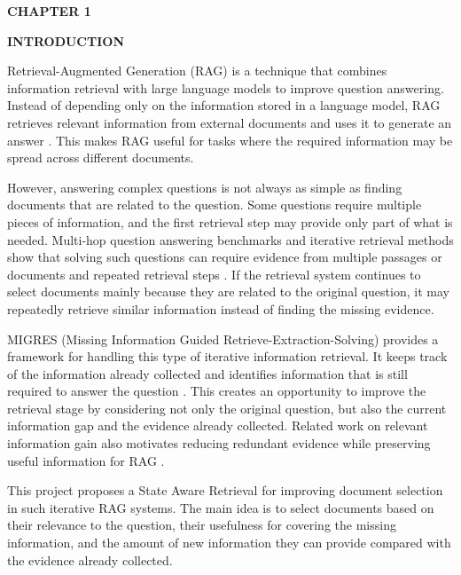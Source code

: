 \documentclass[12pt,a4paper]{report}
\newcommand{\chaptertitle}[2]{
    \begin{center}
        {\fontsize{18}{21}\selectfont\bfseries CHAPTER #1\par}
        \vspace{0.10in}
        {\fontsize{18}{21}\selectfont\bfseries #2\par}
    \end{center}
    \vspace{0.12in}
}
\begin{document}



\setcounter{page}{1}
\chaptertitle{1}{INTRODUCTION}
\justifying

Retrieval-Augmented Generation (RAG) is a technique that combines information retrieval with large language models to improve question answering. Instead of depending only on the information stored in a language model, RAG retrieves relevant information from external documents and uses it to generate an answer \cite{lewis2020rag}. This makes RAG useful for tasks where the required information may be spread across different documents.

However, answering complex questions is not always as simple as finding documents that are related to the question. Some questions require multiple pieces of information, and the first retrieval step may provide only part of what is needed. Multi-hop question answering benchmarks and iterative retrieval methods show that solving such questions can require evidence from multiple passages or documents and repeated retrieval steps \cite{yang2018hotpotqa,trivedi2022musique,yadav2020iterative}. If the retrieval system continues to select documents mainly because they are related to the original question, it may repeatedly retrieve similar information instead of finding the missing evidence.

MIGRES (Missing Information Guided Retrieve-Extraction-Solving) provides a framework for handling this type of iterative information retrieval. It keeps track of the information already collected and identifies information that is still required to answer the question \cite{wang2025migres}. This creates an opportunity to improve the retrieval stage by considering not only the original question, but also the current information gap and the evidence already collected. Related work on relevant information gain also motivates reducing redundant evidence while preserving useful information for RAG \cite{pickett2024better}.

This project proposes a State Aware Retrieval for improving document selection in such iterative RAG systems. The main idea is to select documents based on their relevance to the question, their usefulness for covering the missing information, and the amount of new information they can provide compared with the evidence already collected.
\end{document}

